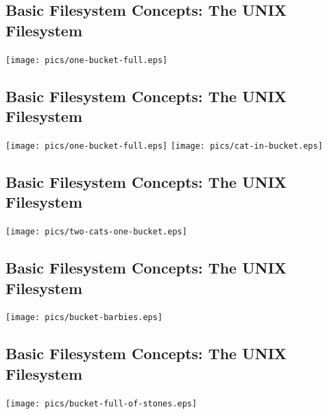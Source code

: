 \documentclass[xga]{xdvislides}
\begin{document}
\subsection{Basic Filesystem Concepts: The UNIX Filesystem}
\begin{center}
\texttt{[image: pics/one-bucket-full.eps]} \\
\end{center}

\subsection{Basic Filesystem Concepts: The UNIX Filesystem}
\vspace*{\fill}
\begin{center}
\texttt{[image: pics/one-bucket-full.eps]}
\hspace*{5mm}
\texttt{[image: pics/cat-in-bucket.eps]}
\end{center}
\vspace*{\fill}

\subsection{Basic Filesystem Concepts: The UNIX Filesystem}
\vspace*{\fill}
\begin{center}
\texttt{[image: pics/two-cats-one-bucket.eps]} \\
\end{center}
\vspace*{\fill}

\subsection{Basic Filesystem Concepts: The UNIX Filesystem}
\begin{center}
\texttt{[image: pics/bucket-barbies.eps]} \\
\end{center}

\subsection{Basic Filesystem Concepts: The UNIX Filesystem}
\vspace*{\fill}
\begin{center}
\texttt{[image: pics/bucket-full-of-stones.eps]} \\
\end{center}
\vspace*{\fill}
\end{document}
